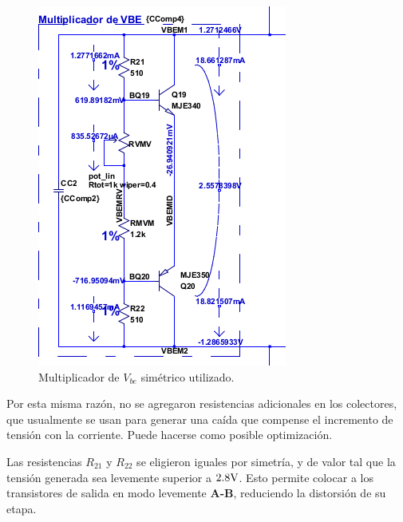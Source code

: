 \begin{figure}
  \begin{center}
   \includegraphics[height=0.5\textwidth]{img/mvbe.png}
   \caption{Multiplicador de $V_{be}$ simétrico utilizado.}
   \label{fig:mvbe}  
  \end{center}   
\end{figure}


Por esta misma razón, no se agregaron resistencias adicionales en los colectores, que usualmente se usan para generar una caída que compense el incremento de tensión con la corriente. Puede hacerse como posible optimización.

Las resistencias $R_{21}$ y $R_{22}$ se eligieron iguales por simetría, y de valor tal que la tensión generada sea levemente superior a $2.8 \si[per-mode=symbol]{\volt}$. Esto permite colocar a los transistores de salida en modo levemente \textbf{A-B}, reduciendo la distorsión de su etapa.













